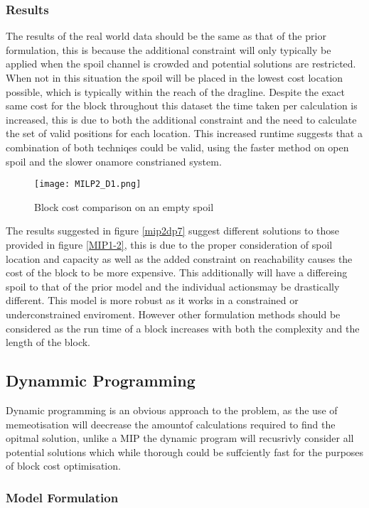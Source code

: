 \subsubsection{Results}
The results of the real world data should be the same as that of the prior formulation, this is because the additional constraint will only typically be applied when the spoil channel is crowded and potential solutions are restricted. When not in this situation the spoil will be placed in the lowest cost location possible, which is typically within the reach of the dragline. Despite the exact same cost for the block throughout this dataset the time taken per calculation is increased, this is due to both the additional constraint and the need to calculate the set of valid positions for each location. This increased runtime suggests that a combination of both techniqes could be valid, using the faster method on open spoil and the slower onamore constrianed system. 
\begin{figure}[h]
\caption{Block cost comparison on an empty spoil}
\label{MIP-1}
\texttt{[image: MILP2\_D1.png]}
\end{figure}
The results suggested in figure \ref{mip2dp7} suggest different solutions to those provided in figure \ref{MIP1-2}, this is due to the proper consideration of spoil location and capacity as well as the added constraint on reachability causes the cost of the block to be more expensive. This additionally will have a differeing spoil to that of the prior model and the individual actionsmay be drastically different. This model is more robust as it works in a constrained or underconstrained enviroment. However other formulation methods should be considered as the run time of a block increases with both the complexity and the length of the block. 
\subsection{Dynammic Programming}
Dynamic programming is an obvious approach to the problem, as the use of memeotisation will deecrease the amountof calculations required to find the opitmal solution, unlike a MIP the dynamic program will recusrivly consider all potential solutions which while thorough could be suffciently fast for the purposes of block cost optimisation. 
\subsubsection{Model Formulation}
